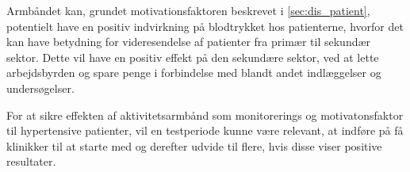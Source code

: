 Armbåndet kan, grundet motivationsfaktoren beskrevet i \autoref{sec:dis_patient}, potentielt have en positiv indvirkning på blodtrykket hos patienterne, hvorfor det kan have betydning for videresendelse af patienter fra primær til sekundær sektor. Dette vil have en positiv effekt på den sekundære sektor, ved at lette arbejdsbyrden og spare penge i forbindelse med blandt andet indlæggelser og undersøgelser.

For at sikre effekten af aktivitetsarmbånd som monitorerings og motivatonsfaktor til hypertensive patienter, vil en testperiode kunne være relevant, at indføre på få klinikker til at starte med og derefter udvide til flere, hvis disse viser positive resultater.